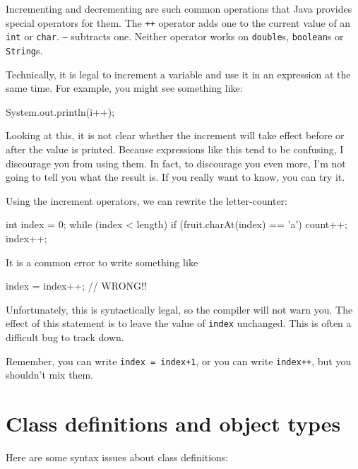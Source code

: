 Incrementing and decrementing are such common operations that Java provides special operators for them.
The {\tt ++} operator adds one to the current value of an {\tt int} or {\tt char}.
{\tt --} subtracts one.
Neither operator works on {\tt double}s, {\tt boolean}s or {\tt String}s.

Technically, it is legal to increment a variable and use it in an expression at the same time.
For example, you might see something like:

\begin{code}
    System.out.println(i++);
\end{code}

Looking at this, it is not clear whether the increment will take effect before or after the value is printed.
Because expressions like this tend to be confusing, I discourage you from using them.
In fact, to discourage you even more, I'm not going to tell you what the result is.
If you really want to know, you can try it.

Using the increment operators, we can rewrite the letter-counter:

\begin{code}
    int index = 0;
    while (index < length) {
        if (fruit.charAt(index) == 'a') {
            count++;
        }
        index++;
    }
\end{code}

It is a common error to write something like

\begin{code}
    index = index++;             // WRONG!!
\end{code}

Unfortunately, this is syntactically legal, so the compiler will not warn you.
The effect of this statement is to leave the value of {\tt index} unchanged.
This is often a difficult bug to track down.

Remember, you can write {\tt index = index+1}, or you can write {\tt index++}, but you shouldn't mix them.


\section{Class definitions and object types}

Here are some syntax issues about class definitions:

